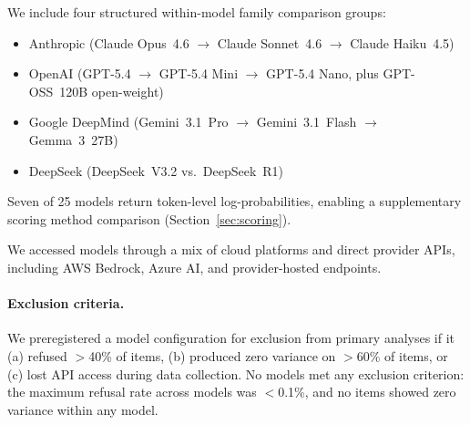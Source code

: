 \documentclass[11pt]{article}
\newcommand{\nmodels}{25}
\begin{document}
We include four structured within-model family comparison groups:
\begin{itemize}
    \item Anthropic (Claude Opus~4.6 $\to$ Claude Sonnet~4.6 $\to$ Claude Haiku~4.5)
    \item OpenAI (GPT-5.4 $\to$ GPT-5.4 Mini $\to$ GPT-5.4 Nano, plus GPT-OSS~120B open-weight)
    \item Google DeepMind (Gemini~3.1~Pro $\to$ Gemini~3.1~Flash $\to$ Gemma~3~27B)
    \item DeepSeek (DeepSeek~V3.2 vs.\ DeepSeek~R1)
\end{itemize}

Seven of \nmodels{} models return token-level log-probabilities, enabling a supplementary scoring method comparison (Section~\ref{sec:scoring}).

We accessed models through a mix of cloud platforms and direct provider APIs, including AWS Bedrock, Azure AI, and provider-hosted endpoints.

\paragraph{Exclusion criteria.}
We preregistered a model configuration for exclusion from primary analyses if it (a) refused $>$40\% of items, (b) produced zero variance on $>$60\% of items, or (c) lost API access during data collection. No models met any exclusion criterion: the maximum refusal rate across models was $<$0.1\%, and no items showed zero variance within any model.
\end{document}
